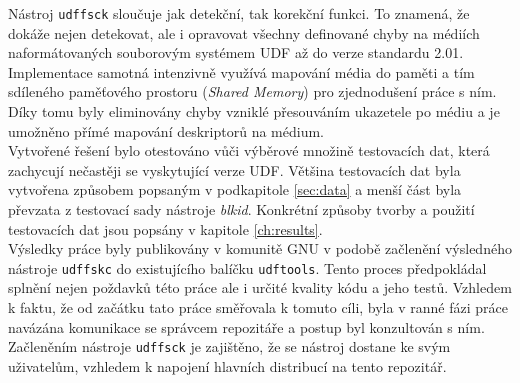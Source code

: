 Nástroj \texttt{udffsck} sloučuje jak detekční, tak korekční funkci. To znamená, že dokáže nejen detekovat, ale i opravovat všechny definované chyby na médiích naformátovaných souborovým systémem UDF až do verze standardu 2.01. Implementace samotná intenzivně využívá mapování média do paměti a tím sdíleného paměťového prostoru (\textit{Shared Memory}) pro zjednodušení práce s ním. Díky tomu byly eliminovány chyby vzniklé přesouváním ukazetele po médiu a je umožněno přímé mapování deskriptorů na médium.\\
Vytvořené řešení bylo otestováno vůči výběrové množině testovacích dat, která zachycují nečastěji se vyskytující verze UDF. Většina testovacích dat byla vytvořena způsobem popsaným v podkapitole \ref{sec:data} a menší část byla převzata z testovací sady nástroje \textit{blkid}. Konkrétní způsoby tvorby a použití testovacích dat jsou popsány v kapitole \ref{ch:results}.\\
Výsledky práce byly publikovány v komunitě GNU v podobě začlenění výsledného nástroje \texttt{udffskc} do existujícího balíčku \texttt{udftools}. Tento proces předpokládal splnění nejen poždavků této práce ale i určité kvality kódu a jeho testů. Vzhledem k faktu, že od začátku tato práce směřovala k tomuto cíli, byla v ranné fázi práce navázána komunikace se správcem repozitáře a postup byl konzultován s ním. Začleněním nástroje \texttt{udffsck} je zajištěno, že se nástroj dostane ke svým uživatelům, vzhledem k napojení hlavních distribucí na tento repozitář.\\


